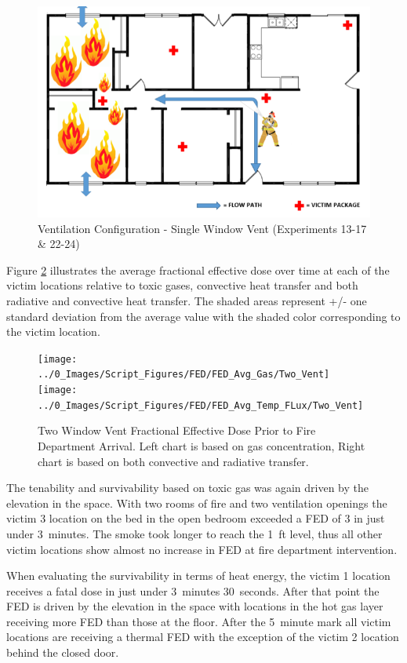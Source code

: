 \documentclass[12pt,oneside]{book}
\begin{document}
\begin{figure}[H]
	\centering
	\includegraphics[width=.65\textwidth]{../0_Images/Ventilation_Configurations/Two_Vent.png}
	\caption{Ventilation Configuration - Single Window Vent (Experiments 13-17 \& 22-24)}
	\label{fig:Vent_Profile-Two_Vent}
\end{figure}

Figure \ref{fig:FED_TwoVent} illustrates the average fractional effective dose over time at each of the victim locations relative to toxic gases, convective heat transfer and both radiative and convective heat transfer. The shaded areas represent +/- one standard deviation from the average value with the shaded color corresponding to the victim location. 

\begin{figure}[H]
	\centering
	\texttt{[image: ../0\_Images/Script\_Figures/FED/FED\_Avg\_Gas/Two\_Vent]}
	\texttt{[image: ../0\_Images/Script\_Figures/FED/FED\_Avg\_Temp\_FLux/Two\_Vent]}
	\caption[Two Window Vent Fractional Effective Dose]{Two Window Vent Fractional Effective Dose Prior to Fire Department Arrival. Left chart is based on gas concentration, Right chart is based on both convective and radiative transfer.}
	\label{fig:FED_TwoVent}
\end{figure}

The tenability and survivability based on toxic gas was again driven by the elevation in the space. With two rooms of fire and two ventilation openings the victim 3 location on the bed in the open bedroom exceeded a FED of 3 in just under 3~minutes. The smoke took longer to reach the 1~ft level, thus all other victim locations show almost no increase in FED at fire department intervention.

When evaluating the survivability in terms of heat energy, the victim 1 location receives a fatal dose in just under 3~minutes 30~seconds. After that point the FED is driven by the elevation in the space with locations in the hot gas layer receiving more FED than those at the floor. After the 5~minute mark all victim locations are receiving a thermal FED with the exception of the victim 2 location behind the closed door.  
\end{document}
